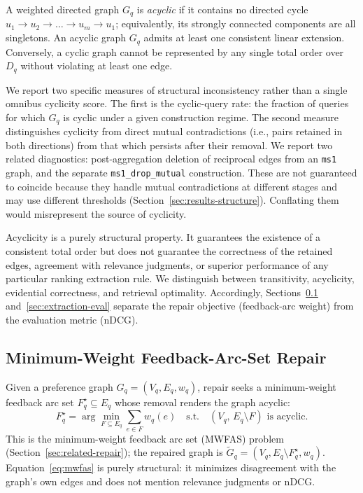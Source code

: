 \documentclass[pdflatex,sn-basic,Numbered]{sn-jnl}
\begin{document}
A weighted directed graph $G_q$ is \emph{acyclic} if it contains no directed
cycle $u_1 \to u_2 \to \dots \to u_m \to u_1$; equivalently, its strongly
connected components are all singletons. An acyclic graph $G_q$ admits at
least one consistent linear extension. Conversely, a cyclic graph cannot be
represented by any single total order over $D_q$ without violating at least
one edge.

We report two specific measures of structural inconsistency rather than a
single omnibus cyclicity score. The first is the cyclic-query rate: the
fraction of queries for which $G_q$ is cyclic under a given construction
regime. The second measure distinguishes cyclicity from direct mutual
contradictions (i.e., pairs retained in both directions) from that which
persists after their removal. We report two related diagnostics:
post-aggregation deletion of reciprocal edges from an \texttt{ms1} graph,
and the separate \texttt{ms1\_drop\_mutual} construction. These are not
guaranteed to coincide because they handle mutual contradictions at
different stages and may use different thresholds
(Section~\ref{sec:results-structure}). Conflating them would misrepresent
the source of cyclicity.

Acyclicity is a purely structural property. It guarantees the existence of a
consistent total order but does not guarantee the correctness of the
retained edges, agreement with relevance judgments, or superior performance
of any particular ranking extraction rule. We distinguish between
transitivity, acyclicity, evidential correctness, and retrieval optimality.
Accordingly, Sections~\ref{sec:mwfas-repair} and~\ref{sec:extraction-eval}
separate the repair objective (feedback-arc weight) from the evaluation
metric (nDCG).

\subsection{Minimum-Weight Feedback-Arc-Set Repair}
\label{sec:mwfas-repair}

Given a preference graph $G_q = (V_q, E_q, w_q)$, repair seeks a
minimum-weight feedback arc set $F_q^\star \subseteq E_q$ whose removal
renders the graph acyclic:
\begin{equation}
F_q^\star = \arg\min_{F \subseteq E_q} \sum_{e \in F} w_q(e)
\quad \text{s.t.} \quad (V_q,\, E_q \setminus F) \text{ is acyclic}.
\label{eq:mwfas}
\end{equation}
This is the minimum-weight feedback arc set (MWFAS) problem
(Section~\ref{sec:related-repair}); the repaired graph is
$\widetilde{G}_q = (V_q, E_q \setminus F_q^\star, w_q)$.
Equation~\eqref{eq:mwfas} is purely structural: it minimizes disagreement
with the graph's own edges and does not mention relevance judgments or
nDCG.
\end{document}
